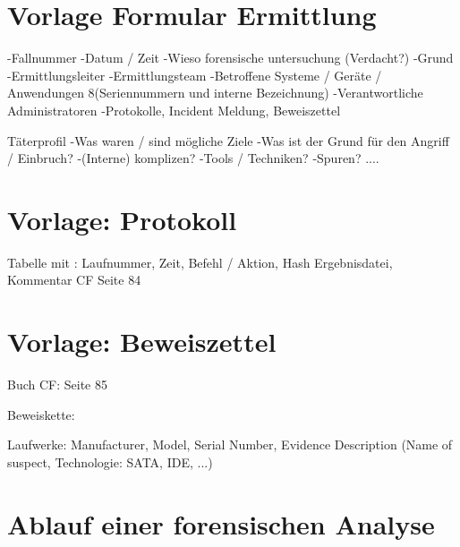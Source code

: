 
%


%
     





\chapter{Vorlage Formular Ermittlung}
-Fallnummer
-Datum / Zeit
-Wieso forensische untersuchung (Verdacht?)
-Grund
-Ermittlungsleiter
-Ermittlungsteam
-Betroffene Systeme / Geräte / Anwendungen 8(Seriennummern und interne Bezeichnung)
-Verantwortliche Administratoren
-Protokolle, Incident Meldung, Beweiszettel

Täterprofil
-Was waren / sind mögliche Ziele
-Was ist der Grund für den Angriff / Einbruch?
-(Interne) komplizen?
-Tools / Techniken?
-Spuren?
....
\chapter{Vorlage: Protokoll}


Tabelle mit : Laufnummer, Zeit, Befehl / Aktion, Hash Ergebnisdatei, Kommentar
CF Seite 84

\chapter{Vorlage: Beweiszettel} \label{appx:Template:ProofPaper}
Buch CF: Seite 85

Beweiskette:

Laufwerke: Manufacturer, Model, Serial Number, Evidence Description (Name of suspect, Technologie: SATA, IDE, ...)





\chapter{Ablauf einer forensischen Analyse}
